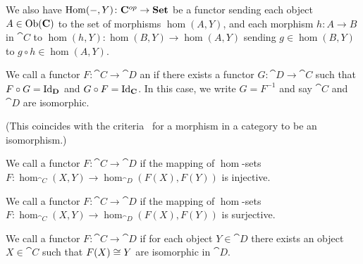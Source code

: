 \begin{node}[Functors]
\begin{node}[Examples]
\begin{node}
We also have $\operatorname{Hom}(-,Y)\colon\mathbf{C}^{op}\to\mathbf{Set}$ be a functor sending each
object $A\in\operatorname{Ob}(\mathbf{C})$ to the set of morphisms $\hom(A,Y)$, and each
morphism $h\colon A\to B$ in $\cat{C}$ to $\hom(h,Y)\colon\hom(B,Y)\to\hom(A,Y)$
sending $g\in\hom(B,Y)$ to $g\circ h\in\hom(A,Y)$.
\end{node}
\end{node} %

\begin{node}\label{cat-001A}%

\begin{definition}\label{cat-001D}%
We call a functor $F\colon\cat{C}\to\cat{D}$ an 
if there exists a functor $G\colon\cat{D}\to\cat{C}$ such that $F\circ G=\operatorname{Id}_{\mathbf{D}}$
and $G\circ F=\operatorname{Id}_{\mathbf{C}}$. In this case, we write $G=F^{-1}$ and say
$\cat{C}$ and $\cat{D}$ are isomorphic.

(This coincides with the criteria~ for a morphism in a
category to be an isomorphism.)
\end{definition}

\begin{definition}\label{cat-0019}%
We call a functor $F\colon\cat{C}\to\cat{D}$  if the
mapping of $\hom$-sets $F\colon\hom_{\cat{C}}(X,Y)\to\hom_{\cat{D}}(F(X),F(Y))$
is injective.
\end{definition}

\begin{definition}\label{cat-0018}%
We call a functor $F\colon\cat{C}\to\cat{D}$  if the
mapping of $\hom$-sets $F\colon\hom_{\cat{C}}(X,Y)\to\hom_{\cat{D}}(F(X),F(Y))$
is surjective.
\end{definition}

\begin{definition}\label{cat-001E}%
We call a functor $F\colon\cat{C}\to\cat{D}$  if
for each object $Y\in\cat{D}$ there exists an object $X\in\cat{C}$ such
that $F(X)\cong Y$ are isomorphic in $\cat{D}$.
\end{definition}

\end{node} %

\end{node}

